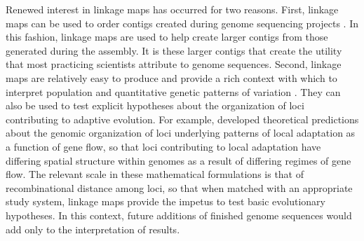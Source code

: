 \documentclass[11pt]{article}
\begin{document}
Renewed interest in linkage maps has occurred for two reasons. First, linkage maps can be used to order contigs 
created during genome sequencing projects \citep{Mackay:2012, Martinez-Garcia:2013}. In this fashion, linkage 
maps are used to help create larger contigs from those generated during the assembly. It is these larger contigs that 
create the utility that most practicing scientists attribute to genome sequences. Second, linkage maps are relatively 
easy to produce and provide a rich context with which to interpret population and quantitative genetic patterns of variation 
\citep[e.g.,][]{Eckert:2010a, Eckert:2010b, Eckert:2013a, Yeaman:2013}. They can also be used to test explicit hypotheses about 
the organization of loci contributing to adaptive evolution. For example, \citet{Yeaman:2011} developed theoretical 
predictions about the genomic organization of loci underlying patterns of local adaptation as a function of gene flow, 
so that loci contributing to local adaptation have differing spatial structure within genomes as a result of differing 
regimes of gene flow. The relevant scale \citep[\textit{sensu}][]{Houle:2011} in these mathematical formulations is that 
of recombinational distance among loci, so that when matched with an appropriate study system, 
linkage maps provide the impetus to test basic evolutionary hypotheses. In this context, future additions of finished 
genome sequences would add only to the interpretation of results.
\end{document}
